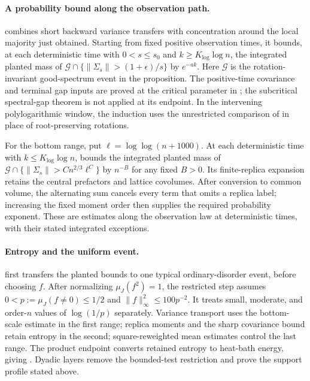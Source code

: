 \paragraph{A probability bound along the observation path.}
 combines short backward variance
transfers with concentration around the local majority just obtained.
Starting from fixed positive observation times, it bounds, at each
deterministic time with $0<s\le s_0$ and $k\ge K_{\log}\log n$, the
integrated planted mass of
$\mathcal G\cap\{\|\Sigma_s\|>(1+\epsilon)/s\}$ by $e^{-ak}$.
Here $\mathcal G$ is the rotation-invariant good-spectrum event in the
proposition. The positive-time
covariance and terminal gap inputs are proved at the critical parameter
in ; the subcritical spectral-gap theorem is
not applied at its endpoint. In the intervening polylogarithmic window,
the induction uses the unrestricted comparison of
 in place of root-preserving rotations.

For the bottom range, put $\ell=\log\log(n+1000)$. At each deterministic
time with $k\le K_{\log}\log n$,  bounds
the integrated planted mass of
$\mathcal G\cap\{\|\Sigma_s\|>Cn^{2/3}\ell^C\}$ by $n^{-B}$ for any
fixed $B>0$. Its
finite-replica expansion retains the central prefactors and lattice
covolumes. After conversion to common volume, the alternating sum cancels
every term that omits a replica label; increasing the fixed moment order
then supplies the required probability exponent. These are estimates
along the observation law at deterministic times, with their stated
integrated exceptions.

\paragraph{Entropy and the uniform event.}
 first transfers the planted bounds to one typical
ordinary-disorder event, before choosing $f$. After normalizing
$\mu_J(f^2)=1$, the restricted step assumes
$0<p:=\mu_J(f\ne0)\le1/2$ and $\|f\|_\infty^2\le100p^{-2}$.
It treats small, moderate, and order-$n$ values of $\log(1/p)$ separately.
Variance transport uses the bottom-scale estimate in the first range;
replica moments and the sharp covariance bound retain entropy in the
second; square-reweighted mean estimates control the last range. The
product endpoint converts retained entropy to heat-bath energy, giving
. Dyadic layers remove the bounded-test
restriction and prove the support profile stated above.


